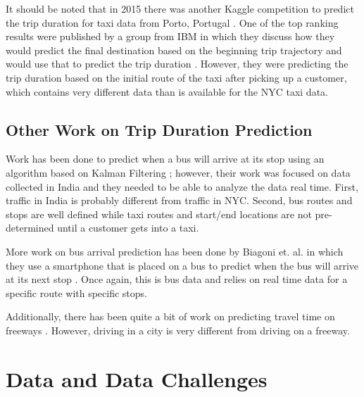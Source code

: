 \documentclass[conference]{IEEEtran}
\begin{document}
It should be noted that in 2015 there was another Kaggle competition to predict the trip duration for taxi data from Porto, Portugal \cite{kagglep}.  One of the top ranking results were published by a group from IBM in which they discuss how they would predict the final destination based on the beginning trip trajectory and would use that to predict the trip duration \cite{ibm}.  However, they were predicting the trip duration based on the initial route of the taxi after picking up a customer, which contains very different data than is available for the NYC taxi data.

\subsection{Other Work on Trip Duration Prediction}
Work has been done to predict when a bus will arrive at its stop using an algorithm based on Kalman Filtering  \cite{india}; however, their work was focused on data collected in India and they needed to be able to analyze the data real time.  First, traffic in India is probably different from traffic in NYC.  Second, bus routes and stops are well defined while taxi routes and start/end locations are not pre-determined until a customer gets into a taxi. 

More work on bus arrival prediction has been done by Biagoni et. al. in which they use a smartphone that is placed on a bus to predict when the bus will arrive at its next stop \cite{et}.  Once again, this is bus data and relies on real time data for a specific route with specific stops.

Additionally, there has been quite a bit of work on predicting travel time on freeways \cite{freewayca} \cite{highway}.  However, driving in a city is very different from driving on a freeway.


\section{Data and Data Challenges}
 
\end{document}
